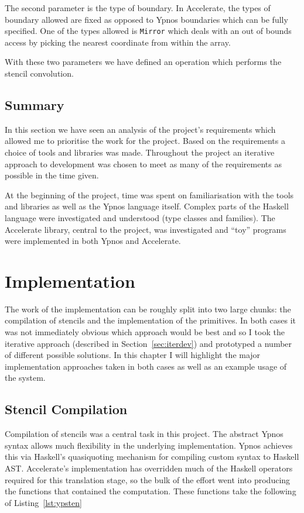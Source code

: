 \documentclass[12pt,a4paper,twoside]{scrbook}
\begin{document}
The second parameter is the type of boundary. In Accelerate, the types of
boundary allowed are fixed as opposed to Ypnos boundaries which can be fully
specified. One of the types allowed is \texttt{Mirror} which deals with an out
of bounds access by picking the nearest coordinate from within the array.

With these two parameters we have defined an operation which performs the
stencil convolution.


\section{Summary}

In this section we have seen an analysis of the project's requirements which
allowed me to prioritise the work for the project. Based on the requirements a
choice of tools and libraries was made. Throughout the project an iterative
approach to development was chosen to meet as many of the requirements as
possible in the time given.

At the beginning of the project, time was spent on familiarisation with the
tools and libraries as well as the Ypnos language itself. Complex parts of the
Haskell language were investigated and understood (type classes and
families). The Accelerate library, central to the project, was investigated and
``toy'' programs were implemented in both Ypnos and Accelerate.

\chapter{Implementation}
\label{sec:impl}

The work of the implementation can be roughly split into two large chunks: the
compilation of stencils and the implementation of the primitives. In both cases
it was not immediately obvious which approach would be best and so I took the
iterative approach (described in Section~\ref{sec:iterdev}) and prototyped a
number of different possible solutions. In this chapter I will highlight the
major implementation approaches taken in both cases as well as an example usage
of the system.

\section{Stencil Compilation}

Compilation of stencils was a central task in this project. The abstract Ypnos
syntax allows much flexibility in the underlying implementation.  Ypnos achieves
this via Haskell's quasiquoting mechanism\cite{} for compiling custom syntax to
Haskell AST. Accelerate's implementation has overridden much of the Haskell
operators required for this translation stage, so the bulk of the effort went
into producing the functions that contained the computation. These functions
take the following of Listing~\ref{lst:ypsten}
\end{document}
